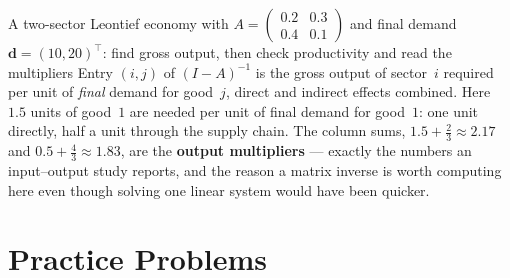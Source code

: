 \begin{worked}{A two-sector Leontief economy with $A=\begin{pmatrix}0.2&0.3\\0.4&0.1\end{pmatrix}$ and final demand $\mathbf d=(10,20)^{\!\top}$: find gross output, then check productivity and read the multipliers}
Entry $(i,j)$ of $(I-A)^{-1}$ is the gross output of sector~$i$ required per
unit of \emph{final} demand for good~$j$, direct and indirect effects
combined. Here $1.5$ units of good~$1$ are needed per unit of final demand
for good~$1$: one unit directly, half a unit through the supply chain. The
column sums, $1.5+\tfrac23\approx2.17$ and $0.5+\tfrac43\approx1.83$, are
the \textbf{output multipliers} --- exactly the numbers an input--output
study reports, and the reason a matrix inverse is worth computing here even
though solving one linear system would have been quicker.
\end{worked}

\section{Practice Problems}

